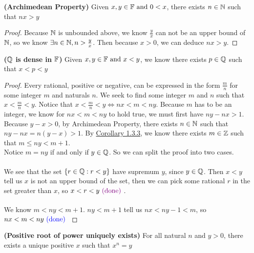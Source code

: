 \documentclass{report}
\begin{document}
\begin{theorem}
\label{1.3.4}
\textbf{(Archimedean Property)} Given $x,y\in\mathbb{F}\text{ and }0<x$, there exists $n\in\mathbb{N}$ such that $nx>y$ 
\end{theorem}
\begin{proof}
 Because $\mathbb{N}$ is unbounded above, we know  $\frac{y}{x}$ can not be an upper bound of $\mathbb{N}$, so we know  $\exists n\in\mathbb{N},n>\frac{y}{x} $. Then because $x>0$, we can deduce $nx>y$.
\end{proof}
\begin{theorem}
\label{1.3.5}
\textbf{($\mathbb{Q}$ is dense in $\mathbb{F}$)} Given $x,y\in\mathbb{F}\text{ and }x<y$, we know there exists $p \in\mathbb{Q}$ such that $x<p<y$
\end{theorem}
\begin{proof}
Every rational, positive or negative, can be expressed in the form $\frac{m}{n}$ for some integer $m$ and naturals $n$. We seek to find some integer $m$ and $n$ such that $x<\frac{m}{n}<y$. Notice that $x<\frac{m}{n}<y\iff nx<m<ny$. Because $m$ has to be an integer, we know for $nx<m<ny$ to hold true, we must first have $ny-nx>1$. Because $y-x>0$, by Archimedean Property, there exists $n\in\mathbb{N}$ such that $ny-nx=n(y-x)>1$. By \hyperref[1.3.3]{Corollary 1.3.3}, we know there exists $m \in\mathbb{Z}$ such that $m\leq  ny<m+1$.\\

Notice $m=ny$ if and only if $ y\in\mathbb{Q}$. So we can split the proof into two cases.\\

\\

We see that the set $\{ r\in\mathbb{Q}:r<y \}$ have supremum $y$, since $y\in\mathbb{Q}$. Then $x<y$ tell us $x$ is not an upper bound of the set, then we can pick some rational $r$ in the set greater than $x$, so $x<r<y\textcolor{violet}{\text{ (done) }}$.\\

\\ 

We know $m<ny<m+1$. $ny<m+1$ tell us $nx<ny-1<m$, so $nx<m<ny\textcolor{blue}{\text{ (done) }}$ 
\end{proof}
\begin{theorem}
\label{1.3.6}
\textbf{(Positive root of power uniquely exists)} For all natural $n$ and $y>0$, there exists a unique positive $x$ such that $x^n=y$
\end{theorem}
\end{document}
